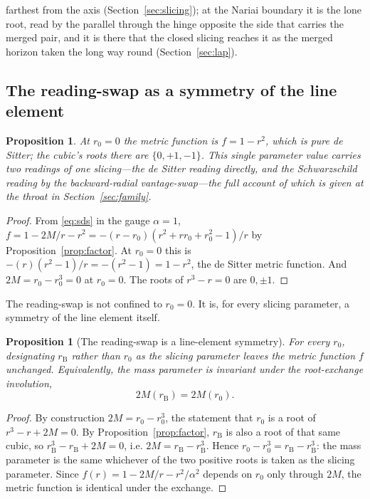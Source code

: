 \documentclass[11pt,a4paper]{article}
\newtheorem{proposition}[theorem]{Proposition}
\theoremstyle{definition}
\begin{document}
farthest from the axis (Section~\ref{sec:slicing}); at the Nariai boundary it is the lone root, read by the parallel through the hinge opposite the side that carries the merged pair, and it is there that the closed slicing reaches it as the merged horizon taken the long way round (Section~\ref{sec:lap}).

\subsection{The reading-swap as a symmetry of the line element}\label{sec:reading}

\begin{proposition}\label{prop:r0zero}
At $r_{0}=0$ the metric function is $f=1-r^{2}$, which is pure de Sitter; the cubic's roots there are $\{0,+1,-1\}$. This single parameter value carries two readings of one slicing---the de Sitter reading directly, and the Schwarzschild reading by the backward-radial vantage-swap---the full account of which is given at the throat in Section~\ref{sec:family}.
\end{proposition}

\begin{proof}
From \eqref{eq:sds} in the gauge $\alpha=1$, $f=1-2M/r-r^{2}=-(r-r_{0})(r^{2}+r r_{0}+r_{0}^{2}-1)/r$ by Proposition~\ref{prop:factor}. At $r_{0}=0$ this is $-(r)(r^{2}-1)/r=-(r^{2}-1)=1-r^{2}$, the de Sitter metric function. And $2M=r_{0}-r_{0}^{3}=0$ at $r_{0}=0$. The roots of $r^{3}-r=0$ are $0,\pm1$.
\end{proof}

The reading-swap is not confined to $r_{0}=0$. It is, for every slicing parameter, a symmetry of the line element itself.

\begin{proposition}[The reading-swap is a line-element symmetry]\label{prop:readingswap}
For every $r_{0}$, designating $r_{\mathrm{B}}$ rather than $r_{0}$ as the slicing parameter leaves the metric function $f$ unchanged. Equivalently, the mass parameter is invariant under the root-exchange involution,
\begin{equation}
  2M(r_{\mathrm{B}})=2M(r_{0}).
\end{equation}
\end{proposition}

\begin{proof}
By construction $2M=r_{0}-r_{0}^{3}$, the statement that $r_{0}$ is a root of $r^{3}-r+2M=0$. By Proposition~\ref{prop:factor}, $r_{\mathrm{B}}$ is also a root of that same cubic, so $r_{\mathrm{B}}^{3}-r_{\mathrm{B}}+2M=0$, i.e. $2M=r_{\mathrm{B}}-r_{\mathrm{B}}^{3}$. Hence $r_{0}-r_{0}^{3}=r_{\mathrm{B}}-r_{\mathrm{B}}^{3}$: the mass parameter is the same whichever of the two positive roots is taken as the slicing parameter. Since $f(r)=1-2M/r-r^{2}/\alpha^{2}$ depends on $r_{0}$ only through $2M$, the metric function is identical under the exchange.
\end{proof}
\end{document}
